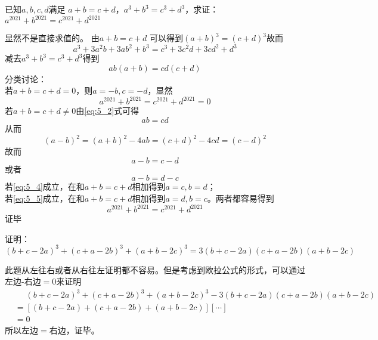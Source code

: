 \documentclass[windows,csize4,answers]{BHCexam}
\begin{document}
\begin{groups}
\begin{questions}[]
        \question[5] 已知$a,b,c,d$满足 $a+b=c+d$，$a^3+b^3=c^3+d^3$，求证：$a^{2021}+b^{2021}=c^{2021}+d^{2021}$
        \begin{solution}{0.5cm}
            \methodonly 显然不是直接求值的。
            由$a+b=c+d$ 可以得到$(a+b)^3=(c+d)^3$故而
            \begin{equation}
                \label{eq:5_1}
                a^3+3a^2b+3ab^2+b^3=c^3+3c^2d+3cd^2+d^3
            \end{equation}
            减去$a^3+b^3=c^3+d^3$得到
            \begin{equation}
                \label{eq:5_2}
                ab(a+b)=cd(c+d)
            \end{equation}
            分类讨论： \\
            若$a+b=c+d=0$，则$a=-b,c=-d$，显然
            \[
                a^{2021}+b^{2021}=c^{2021}+d^{2021}=0
            \]
            若$a+b=c+d\neq 0$由\ref{eq:5_2}式可得
            \begin{equation}
                \label{eq:5_3}
                ab=cd
            \end{equation}
            从而
            \[
                (a-b)^2=(a+b)^2-4ab=(c+d)^2-4cd=(c-d)^2
            \]
            故而
            \begin{equation}
                \label{eq:5_4}
                a-b=c-d
            \end{equation}
            或者
            \begin{equation}
                \label{eq:5_5}
                a-b=d-c
            \end{equation}
            若\ref{eq:5_4}成立，在和$a+b=c+d$相加得到$a=c,b=d$； \\
            若\ref{eq:5_5}成立，在和$a+b=c+d$相加得到$a=d,b=c$。两者都容易得到
            \[
                a^{2021}+b^{2021}=c^{2021}+d^{2021}
            \]
            证毕
        \end{solution}
        \vspace{3.5cm}

        \question[5]  证明：$(b+c-2a)^3+(c+a-2b)^3+(a+b-2c)^3=3(b+c-2a)(c+a-2b)(a+b-2c)$
        \begin{solution}{0.5cm}
            \methodonly 此题从左往右或者从右往左证明都不容易。但是考虑到欧拉公式的形式，可以通过左边-右边$=0$来证明
            \[
                \begin{aligned}
                    &\phantom{=}(b+c-2a)^3+(c+a-2b)^3+(a+b-2c)^3-3(b+c-2a)(c+a-2b)(a+b-2c) \\ 
                    &=[(b+c-2a)+(c+a-2b)+(a+b-2c)][\cdots] \\ 
                    &=0
                \end{aligned}
            \]
            所以左边$=$右边，证毕。


\end{solution}
\end{questions}
\end{groups}
\end{document}

